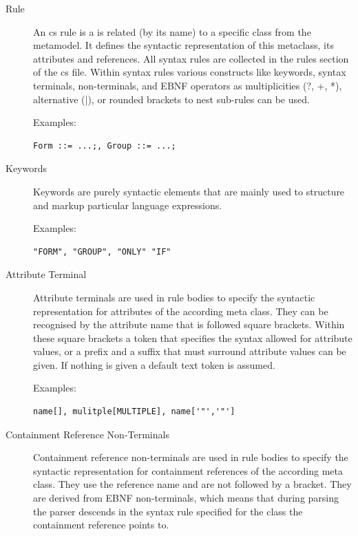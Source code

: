 	\begin{description}
       \item[Rule] An cs rule is a is related (by its name) to a specific
		class from the metamodel. It defines the syntactic representation of this
		metaclass, its attributes and references. All syntax rules are collected in
		the rules section of the cs file. Within syntax rules various constructs like
		keywords, syntax terminals, non-terminals, and EBNF operators as
		multiplicities (?, +, *), alternative (|), or rounded brackets 
		to nest sub-rules can be used.
		
		Examples: \begin{verbatim}Form ::= ...;, Group ::= ...;\end{verbatim}
        
       \item[Keywords] Keywords are purely syntactic elements that are mainly
        used to structure and markup particular language expressions.
        
        Examples: \begin{verbatim}"FORM", "GROUP", "ONLY" "IF" \end{verbatim}
        
        
       \item[Attribute Terminal] Attribute terminals are used in rule bodies to
        specify the syntactic representation for attributes of the according
        meta class. They can be recognised by the attribute name that is followed
        square brackets. Within these square brackets a token that specifies
        the syntax allowed for attribute values, or a prefix and a suffix that
        must surround attribute values can be given. If nothing is given a
        default text token is assumed.

        Examples: \begin{verbatim}name[], mulitple[MULTIPLE], name['"','"']\end{verbatim}


       \item[Containment Reference Non-Terminals] Containment reference non-terminals
       are used in rule bodies to specify the syntactic representation for
       containment references of the according meta class. They use the
       reference name and are not followed by a bracket. They are derived from
       EBNF non-terminals, which means that during parsing the parser descends
       in the syntax rule specified for the class the
       containment reference points to.


\end{description}
